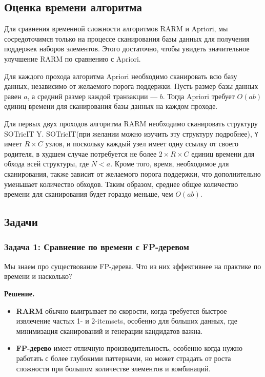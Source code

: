 \subsection{Оценка времени алгоритма}

Для сравнения временной сложности алгоритмов RARM и Apriori, мы сосредоточимся только на процессе сканирования базы данных для получения поддержек наборов элементов. Этого достаточно, чтобы увидеть значительное улучшение RARM по сравнению с Apriori.

Для каждого прохода алгоритма Apriori необходимо сканировать всю базу данных, независимо от желаемого порога поддержки. Пусть размер базы данных равен \(a\), а средний размер каждой транзакции — \(b\). Тогда Apriori требует \(O(ab)\) единиц времени для сканирования базы данных на каждом проходе.

Для первых двух проходов алгоритма RARM необходимо сканировать структуру SOTrieIT Y. SOTrieIT(при желании можно изучить эту структуру подробнее), \texttt{Y} имеет \(R \times C\) узлов, и поскольку каждый узел имеет одну ссылку от своего родителя, в худшем случае потребуется не более \(2 \times R \times C\) единиц времени для обхода всей структуры, где \(N < a\). Кроме того, время, необходимое для сканирования, также зависит от желаемого порога поддержки, что дополнительно уменьшает количество обходов. Таким образом, среднее общее количество времени для сканирования будет гораздо меньше, чем \(O(ab)\).

\subsection{Задачи}

\subsubsection{Задача 1: Сравнение по времени с FP-деревом} Мы знаем про существование FP-дерева. Что из них эффективнее на практике по времени и насколько?

\textbf{Решение.}

\begin{itemize}
    \item \textbf{RARM} обычно выигрывает по скорости, когда требуется быстрое извлечение частых 1- и 2-itemsets, особенно для больших данных, где минимизация сканирований и генерации кандидатов важна.
    \item \textbf{FP-дерево} имеет отличную производительность, особенно когда нужно работать с более глубокими паттернами, но может страдать от роста сложности при большом количестве элементов и комбинаций.
\end{itemize}

